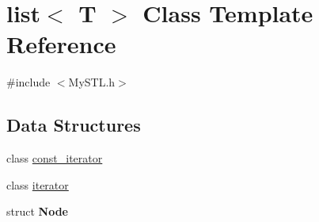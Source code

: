 \section{list$<$ T $>$ Class Template Reference}
\label{classlist}


{\ttfamily \#include $<$MySTL.h$>$}

\subsection*{Data Structures}
\begin{DoxyCompactItemize}
\item 
class \hyperlink{classlist_1_1const__iterator}{const\_\-iterator}
\item 
class \hyperlink{classlist_1_1iterator}{iterator}
\item 
struct {\bfseries Node}
\end{DoxyCompactItemize}
